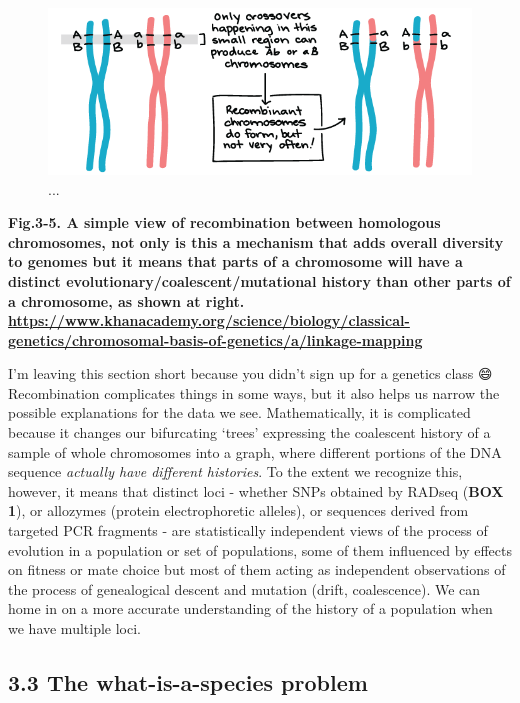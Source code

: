 \documentclass[
]{article}
\begin{document}
\begin{figure}

{\centering \includegraphics[width=0.9\linewidth]{MEImages/recomb} 

}

\caption{...}\label{fig:unnamed-chunk-7}
\end{figure}

\textbf{Fig.3-5. A simple view of recombination between homologous
chromosomes, not only is this a mechanism that adds overall diversity to
genomes but it means that parts of a chromosome will have a distinct
evolutionary/coalescent/mutational history than other parts of a
chromosome, as shown at right.
\url{https://www.khanacademy.org/science/biology/classical-genetics/chromosomal-basis-of-genetics/a/linkage-mapping}
}

I'm leaving this section short because you didn't sign up for a genetics
class 😄 Recombination complicates things in some ways, but it also helps
us narrow the possible explanations for the data we see. Mathematically,
it is complicated because it changes our bifurcating `trees' expressing
the coalescent history of a sample of whole chromosomes into a graph,
where different portions of the DNA sequence \emph{actually have
different histories}. To the extent we recognize this, however, it means
that distinct loci - whether SNPs obtained by RADseq (\textbf{BOX 1}),
or allozymes (protein electrophoretic alleles), or sequences derived
from targeted PCR fragments - are statistically independent views of the
process of evolution in a population or set of populations, some of them
influenced by effects on fitness or mate choice but most of them acting
as independent observations of the process of genealogical descent and
mutation (drift, coalescence). We can home in on a more accurate
understanding of the history of a population when we have multiple loci.

\hypertarget{the-what-is-a-species-problem}{%
\subsection{3.3 The what-is-a-species
problem}\label{the-what-is-a-species-problem}}
\end{document}
